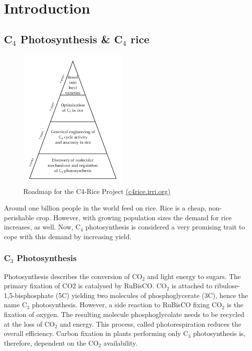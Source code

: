 \chapter{Introduction}
\section{C$_4$ Photosynthesis \& C$_4$ rice}

\begin{figure}%
	\includegraphics[width=0.48\textwidth]{images/C4_roadmap}%
	\caption{Roadmap for the C4-Rice Project \href{http://c4rice.irri.org}{(c4rice.irri.org)}}%
	\label{fig:c4rice_roadmap}%
\end{figure}

Around one billion people in the world feed on rice.
Rice is a cheap, non-perishable crop.
However, with growing population sizes the demand for rice increases, as well.
Now, C$_4$ photosynthesis is considered a very promising trait to cope with this demand by increasing yield.
\subsection{C$_3$ Photosynthesis}
Photosynthesis describes the conversion of CO$_2$ and light energy to sugars.
The primary fixation of CO2 is catalysed by \ac{RuBisCO}.
CO$_2$ is attached to ribulose-1,5-bisphosphate (5C) yielding two molecules of phosphoglycerate (3C), hence the name C$_3$ photosynthesis.
However, a side reaction to \ac{RuBisCO} fixing CO$_2$ is the fixation of oxygen.
The resulting molecule phosphoglycolate needs to be recycled at the loss of CO$_2$ and energy.
This process, called photorespiration reduces the overall efficiency.
Carbon fixation in plants performing only C$_3$ photosynthesis is, therefore, dependent on the CO$_2$ availability.
